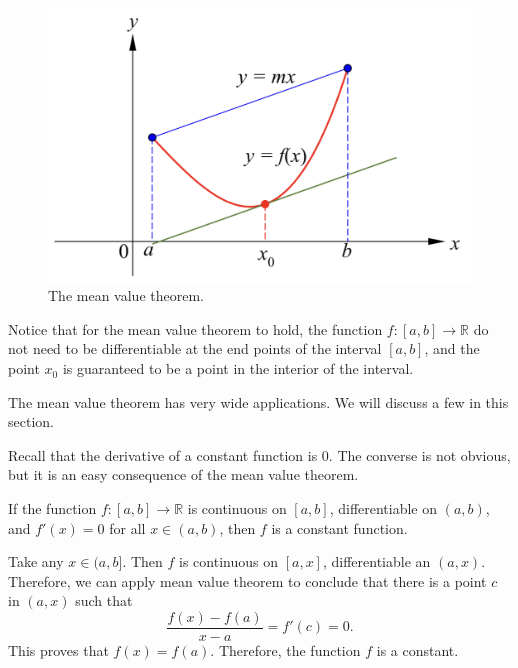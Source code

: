  \begin{figure}[ht]
\centering
\includegraphics[scale=0.2]{Picture24.png}
\caption{  The mean value theorem.\fa}\label{figure24}
\end{figure}
Notice that for the mean value theorem to hold, the function $f:[a,b]\to\mathbb{R}$ do not need to be differentiable at the end points of the interval $[a,b]$, and the point $x_0$ is guaranteed to be a point in the interior of the interval. 

The mean value theorem has very wide applications. We will discuss a few in this section.  



Recall that the derivative of a constant function is 0. The converse is not obvious, but it is an easy consequence of the mean value theorem.
\begin{lemma}[label=lemma230215_2]{}
If the function $f:[a,b]\to\mathbb{R}$ is continuous on $[a, b]$, differentiable on $(a,b)$, and $f'(x)=0$ for all $x\in (a,b)$, then $f$ is a constant function.
\end{lemma}
\begin{myproof}{}
Take any $x\in (a, b]$. Then $f$ is continuous on $[a, x]$, differentiable an $(a, x)$. Therefore, we can apply mean value theorem to conclude that there is a point $c$ in $(a, x)$  such that
\[\frac{f(x)-f(a)}{x-a}=f'(c)=0.\]
This proves that $f(x)=f(a)$. Therefore, the function $f$ is a constant.
\end{myproof}

